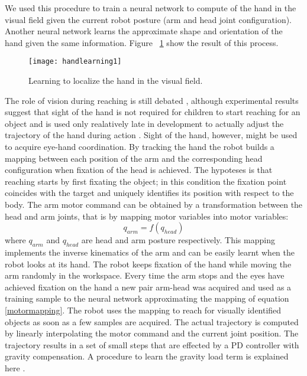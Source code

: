 We used this procedure to train a neural network to compute of the hand in the visual field given the current robot posture (arm and head joint configuration). Another neural network learns the approximate shape and orientation of the hand given the same information. Figure ~\ref{handlearning1} show the result of this process. 

\begin{figure}
\centering
\texttt{[image: handlearning1]}
\caption{Learning to localize the hand in the visual field.}
\label{handlearning1}
\end{figure}

The role of vision during reaching is still debated \cite{saunders03humans}, although experimental results suggest that sight of the hand is not required for children to start reaching for an object \cite{clifton93isvisually,clifton94multimodal} and is used only realatively late in development to actually adjust the trajectory of the hand during action \cite{ashmead93visual}. 
Sight of the hand, however, might be used to acquire eye-hand coordination. By tracking the hand the robot builds a mapping between each position of the arm and the corresponding head configuration when fixation of the head is achieved. The hypoteses is that reaching starts by first fixating the object; in this condition the fixation point coincides with the target and uniquely identifies its position with respect to the body. The arm motor command can be obtained by a transformation between the head and arm joints, that is by mapping motor variables into motor variables:
\begin{equation}q_{arm}=f(q_{head})\label{motormapping}\end{equation}
where $q_{arm}$ and $q_{head}$ are head and arm posture respectively. This mapping implements the inverse kinematics of the arm and can be easily learnt when the robot looks at its hand. The robot keeps fixation of the hand while moving the arm randomly in the workspace. Every time the arm stops and the eyes have achieved fixation on the hand a new pair arm-head was acquired and used as a training sample to the neural network approximating the mapping of equation \ref{motormapping}. The robot uses the mapping to reach for visually identified objects as soon as a few samples are acquired.
The actual trajectory is computed by linearly interpolating the motor command and the current joint position. The trajectory results in a set of small steps that are effected by a PD controller with gravity compensation. A procedure to learn the gravity load term is explained here \cite{natale04thesis}.
